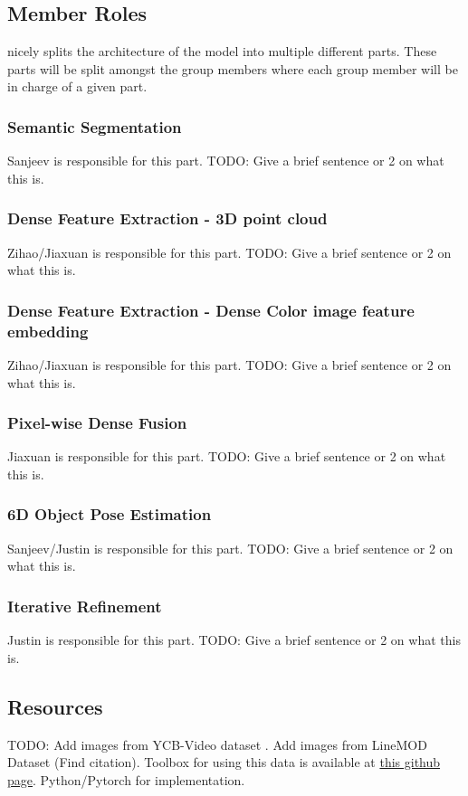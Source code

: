 \documentclass[10pt,twocolumn,letterpaper]{article}
\begin{document}
\subsection{Member Roles}
\cite{wangDenseFusion6DObject2019} nicely splits the architecture of the model into multiple different parts. These parts will be split amongst the group members where each group member will be in charge of a given part.

\subsubsection{Semantic Segmentation}
Sanjeev is responsible for this part. TODO: Give a brief sentence or 2 on what this is.
\subsubsection{Dense Feature Extraction - 3D point cloud}
Zihao/Jiaxuan is responsible for this part. TODO: Give a brief sentence or 2 on what this is.
\subsubsection{Dense Feature Extraction - Dense Color image feature embedding}
Zihao/Jiaxuan is responsible for this part. TODO: Give a brief sentence or 2 on what this is.
\subsubsection{Pixel-wise Dense Fusion}
Jiaxuan is responsible for this part. TODO: Give a brief sentence or 2 on what this is.
\subsubsection{6D Object Pose Estimation}
Sanjeev/Justin is responsible for this part. TODO: Give a brief sentence or 2 on what this is.
\subsubsection{Iterative Refinement}
Justin is responsible for this part. TODO: Give a brief sentence or 2 on what this is.




\subsection{Resources}
TODO: Add images from YCB-Video dataset \cite{xiangPoseCNNConvolutionalNeural2018}. Add images from LineMOD Dataset (Find citation). Toolbox for using this data is available at \href{https://github.com/yuxng/YCB_Video_toolbox}{this github page}. Python/Pytorch for implementation.
\end{document}
